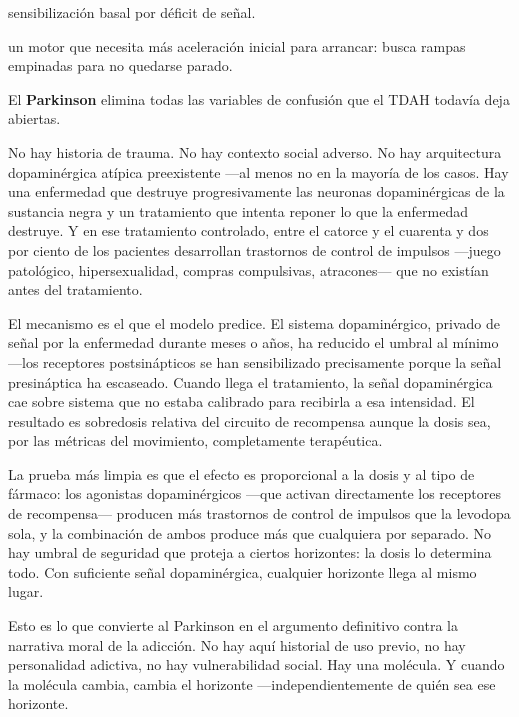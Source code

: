 \begin{fisica}
 sensibilización basal por déficit de señal.

 un motor que necesita más aceleración inicial para arrancar: busca rampas empinadas para no quedarse parado.
\end{fisica}
\noindent El \textbf{Parkinson} elimina todas las variables de confusión que el TDAH todavía deja abiertas.

No hay historia de trauma. No hay contexto social adverso. No hay arquitectura dopaminérgica atípica preexistente —al menos no en la mayoría de los casos. Hay una enfermedad que destruye progresivamente las neuronas dopaminérgicas de la sustancia negra y un tratamiento que intenta reponer lo que la enfermedad destruye. Y en ese tratamiento controlado, entre el catorce y el cuarenta y dos por ciento de los pacientes desarrollan trastornos de control de impulsos —juego patológico, hipersexualidad, compras compulsivas, atracones— que no existían antes del tratamiento.

El mecanismo es el que el modelo predice. El sistema dopaminérgico, privado de señal por la enfermedad durante meses o años, ha reducido el umbral al mínimo —los receptores postsinápticos se han sensibilizado precisamente porque la señal presináptica ha escaseado. Cuando llega el tratamiento, la señal dopaminérgica cae sobre sistema que no estaba calibrado para recibirla a esa intensidad. El resultado es sobredosis relativa del circuito de recompensa aunque la dosis sea, por las métricas del movimiento, completamente terapéutica.

La prueba más limpia es que el efecto es proporcional a la dosis y al tipo de fármaco: los agonistas dopaminérgicos —que activan directamente los receptores de recompensa— producen más trastornos de control de impulsos que la levodopa sola, y la combinación de ambos produce más que cualquiera por separado. No hay umbral de seguridad que proteja a ciertos horizontes: la dosis lo determina todo. Con suficiente señal dopaminérgica, cualquier horizonte llega al mismo lugar.

Esto es lo que convierte al Parkinson en el argumento definitivo contra la narrativa moral de la adicción. No hay aquí historial de uso previo, no hay personalidad adictiva, no hay vulnerabilidad social. Hay una molécula. Y cuando la molécula cambia, cambia el horizonte —independientemente de quién sea ese horizonte.

